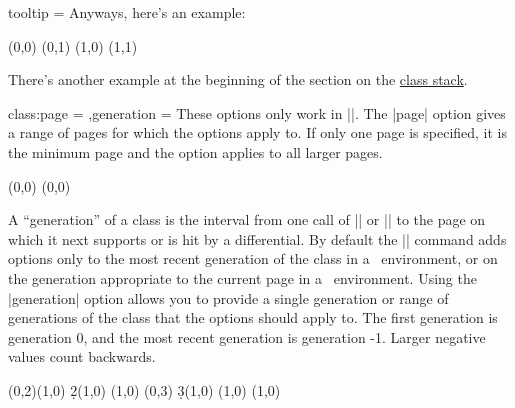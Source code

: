 \begin{sseqdata}[|| name = ex1, cohomological Serre grading]
\begin{key}{tooltip = }
Anyways, here's an example:
\begin{codeexample}[]
\begin{sseqpage}[classes = {tooltip = {(\xcoord,\ycoord)}}]
\class(0,0)
\class(0,1)
\class(1,0)
\class(1,1)
\end{sseqpage}
\end{codeexample}

There's another example at the beginning of the section on the \hyperref[sec:class stack]{class stack}.
\end{key}

\begin{keylist}{class:page = ,generation = }
These options only work in |\classoptions|. The |page| option gives a range of pages for which the options apply to. If only one page is specified, it is the minimum page and the option applies to all larger pages.
\begin{codeexample}[width = 6cm]
\begin{sseqdata}[ name = page_example, no axes,
    title = \page, title style = {yshift = -0.5cm} ]
\class(0,0)
\classoptions[class:page = {2--3},fill,blue](0,0)
\end{sseqdata}

\printpage[ name = page_example, page = 1 ] \qquad
\printpage[ name = page_example, page = 2 ] \qquad
\printpage[ name = page_example, page = 4 ]
\end{codeexample}
A ``generation'' of a class is the interval from one call of |\class| or |\replaceclass| to the page on which it next supports or is hit by a differential.
By default the |\classoptions| command adds options only to the most recent generation of the class in a \sseqdataenv\  environment, or on the generation appropriate to the current page in a \sseqpageenv\  environment. Using the |generation| option allows you to provide a single generation or range of generations of the class that the options should apply to. The first generation is generation 0, and the most recent generation is generation -1. Larger negative values count backwards.
\begin{codeexample}[]
\begin{sseqdata}[ name = page_example2, Adams grading, xscale = 0.6, yscale = 0.5 ]
\class(0,2)\class(1,0)
\d2(1,0)
\replaceclass(1,0)
\class(0,3)
\d3(1,0)
\replaceclass(1,0)
(1,0) %
\end{sseqdata}


\end{codeexample}
\end{keylist}
\end{sseqdata}
